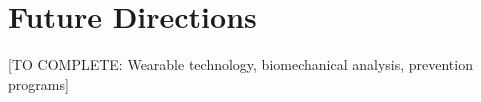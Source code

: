 \section{Future Directions}

[TO COMPLETE: Wearable technology, biomechanical analysis, prevention programs]